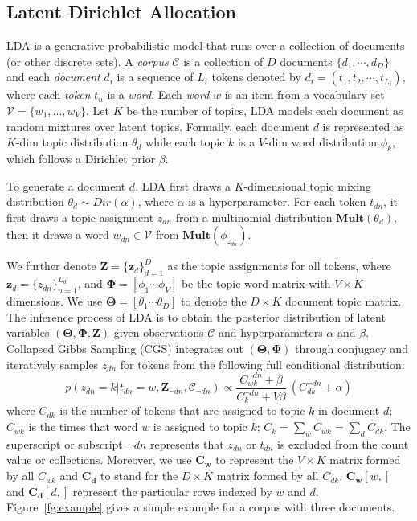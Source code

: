 \documentclass[10pt,journal,cspaper,compsoc]{IEEEtran}
\begin{document}
	\subsection{Latent Dirichlet Allocation}
	LDA is a generative probabilistic model that runs
	over a collection of documents (or other discrete sets).
	A {\em corpus} $\mathcal{C}$ is a collection of $D$
	documents $ \{d_1, \cdots, d_{D}\}$ and
	each {\em document} $d_i$ is a sequence of $L_i$ tokens denoted
	by $d_i = (t_1, t_2, \cdots, t_{L_i})$, where
	each {\em token} $t_n$ is a {\em word}.
	Each {\em word} $w$ is an item from a vocabulary set $\mathcal{V}=\{w_1,...,w_V\}$.
	Let $K$ be the number of topics,
	LDA models each document as random mixtures over latent topics.
	Formally, each document $d$ is represented as
	$K$-dim topic distribution $\theta_d$ while each topic $k$ is a $V$-dim word distribution $\phi_k$, which follows a Dirichlet prior $\beta$.
	
	To generate a document $d$, LDA first draws a $K$-dimensional
	topic mixing distribution $\theta_d \sim Dir(\alpha)$, where $\alpha$ is a hyperparameter. For each token $t_{dn}$, it first draws a topic assignment $z_{dn}$ from a multinomial distribution $\mathbf{Mult}(\theta_d)$,
	then it draws a word $w_{dn} \in \mathcal{V}$ from $\mathbf{Mult}(\phi_{z_{dn}})$.
	
	We further denote $\mathbf{Z}=\{\mathbf{z}_d\}_{d=1}^D$ as the topic assignments for all tokens, where $\mathbf{z}_d = \{z_{dn}\}_{n=1}^{L_d}$, and $\mathbf{\Phi} = [\phi_1 \cdots \phi_{V}]$ be the topic word matrix with $V \times K$ dimensions.
	We use $\mathbf{\Theta}=[\theta_1 \cdots \theta_D]$ to denote the $D \times K$ document topic matrix.
	The inference process of LDA is to obtain the posterior distribution of latent variables $(\mathbf{\Theta, \Phi, Z})$ given observations $\mathcal{C}$ and hyperparameters $\alpha$ and $\beta$.
	Collapsed Gibbs Sampling (CGS) integrates out $\mathbf{(\Theta, \Phi)}$ through conjugacy and iteratively samples $z_{dn}$ for tokens from the following full conditional distribution:
	\begin{equation}
	\label{eq:lda}
	p(z_{dn} = k| t_{dn} = w, \mathbf{Z}_{\neg dn}, \mathcal{C}_{\neg dn}) \propto \frac{C_{wk}^{\neg dn} + \beta}{C_{k}^{\neg dn} + V\beta}~(C_{dk}^{\neg dn}  + \alpha)
	\end{equation}
	where $C_{dk}$ is the number of tokens that are assigned to topic $k$ in document $d$; $C_{wk}$ is the times that word $w$ is assigned to topic $k$; $C_k = \sum_w C_{wk} = \sum_d C_{dk}$.
	The superscript or subscript $\neg dn$ represents that $z_{dn}$ or $t_{dn}$ is excluded from the count value or collections.
	Moreover, we use $\mathbf{C_w}$ to represent the $V\times K$ matrix formed by all $C_{wk}$ and $\mathbf{C_d}$ to stand for the $D\times K$ matrix formed by all $C_{dk}$.
	$\mathbf{C_w}[w,]$ and $\mathbf{C_d}[d,]$ represent the particular rows indexed by $w$ and $d$.
	Figure~\ref{fg:example} gives a simple example for a corpus with three documents.
    \\
    
\end{document}
